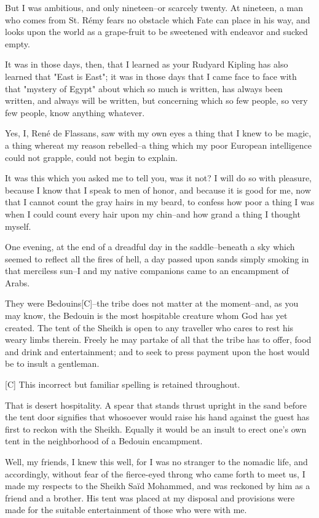 But I was ambitious, and only nineteen--or scarcely twenty. At
nineteen, a man who comes from St. Rémy fears no obstacle which Fate
can place in his way, and looks upon the world as a grape-fruit to be
sweetened with endeavor and sucked empty.

It was in those days, then, that I learned as your Rudyard Kipling has
also learned that "East is East"; it was in those days that I came
face to face with that "mystery of Egypt" about which so much is
written, has always been written, and always will be written, but
concerning which so few people, so very few people, know anything
whatever.

Yes, I, René de Flassans, saw with my own eyes a thing that I knew to
be magic, a thing whereat my reason rebelled--a thing which my poor
European intelligence could not grapple, could not begin to explain.

It was this which you asked me to tell you, was it not? I will do so
with pleasure, because I know that I speak to men of honor, and
because it is good for me, now that I cannot count the gray hairs in
my beard, to confess how poor a thing I was when I could count every
hair upon my chin--and how grand a thing I thought myself.

One evening, at the end of a dreadful day in the saddle--beneath a sky
which seemed to reflect all the fires of hell, a day passed upon sands
simply smoking in that merciless sun--I and my native companions came
to an encampment of Arabs.

They were Bedouins[C]--the tribe does not matter at the moment--and,
as you may know, the Bedouin is the most hospitable creature whom God
has yet created. The tent of the Sheikh is open to any traveller who
cares to rest his weary limbs therein. Freely he may partake of all
that the tribe has to offer, food and drink and entertainment; and to
seek to press payment upon the host would be to insult a gentleman.

  [C] This incorrect but familiar spelling is retained throughout.

That is desert hospitality. A spear that stands thrust upright in the
sand before the tent door signifies that whosoever would raise his
hand against the guest has first to reckon with the Sheikh. Equally
it would be an insult to erect one's own tent in the neighborhood of
a Bedouin encampment.

Well, my friends, I knew this well, for I was no stranger to the
nomadic life, and accordingly, without fear of the fierce-eyed throng
who came forth to meet us, I made my respects to the Sheikh Saïd
Mohammed, and was reckoned by him as a friend and a brother. His tent
was placed at my disposal and provisions were made for the suitable
entertainment of those who were with me.

